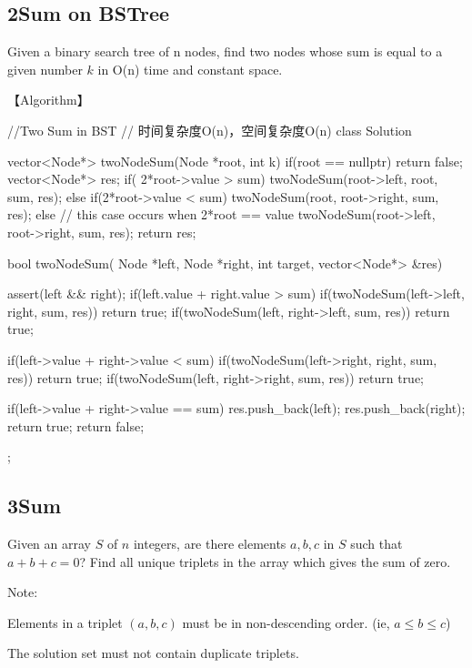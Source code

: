 \subsection{2Sum on BSTree}
Given a binary search tree of n nodes, find two nodes whose sum is equal to a given number $k$ in O(n) time and constant space.

【Algorithm】
\begin{Code}
	//Two Sum in BST
	// 时间复杂度O(n)，空间复杂度O(n)
	class Solution {
		vector<Node*> twoNodeSum(Node *root, int k) {
			if(root == nullptr) return false;
            vector<Node*> res;
        	if( 2*root->value > sum)
        		twoNodeSum(root->left, root, sum, res);
        	else if(2*root->value < sum)
        		twoNodeSum(root, root->right, sum, res);
        	else // this case occurs when 2*root == value
        		twoNodeSum(root->left, root->right, sum, res);
            return res;
		}

        bool twoNodeSum( Node *left, Node *right, int target, vector<Node*> &res){
	       assert(left && right);
	       if(left.value + right.value > sum){
		      if(twoNodeSum(left->left, right, sum, res))
			     return true;
		      if(twoNodeSum(left, right->left, sum, res))
			     return true;	
	       }
	
	       if(left->value + right->value < sum){
		      if(twoNodeSum(left->right, right, sum, res))
			     return true;
		      if(twoNodeSum(left, right->right, sum, res))
			     return true;
	       }

	       if(left->value + right->value == sum){
                res.push_back(left);
                res.push_back(right);
                return true;
            }
            return false;
        }
	};
\end{Code}


\subsection{3Sum} %
\label{sec:3sum}

Given an array $S$ of $n$ integers, are there elements $a, b, c$ in $S$ such
that $a + b + c = 0$? Find all unique triplets in the array which gives the sum
of zero.

Note:
\begindot
\item Elements in a triplet $(a,b,c)$ must be in non-descending order. (ie, $a
\leq b \leq c$)
\item The solution set must not contain duplicate triplets.
\myenddot

